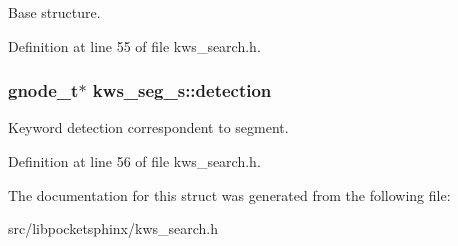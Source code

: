 Base structure. 



Definition at line 55 of file kws\-\_\-search.\-h.

\subsubsection[{detection}]{\setlength{\rightskip}{0pt plus 5cm}gnode\-\_\-t$\ast$ kws\-\_\-seg\-\_\-s\-::detection}\label{structkws__seg__s_a5de99d98b2be6e0348033c9fc05ec139}


Keyword detection correspondent to segment. 



Definition at line 56 of file kws\-\_\-search.\-h.



The documentation for this struct was generated from the following file\-:\begin{DoxyCompactItemize}
\item 
src/libpocketsphinx/kws\-\_\-search.\-h\end{DoxyCompactItemize}
